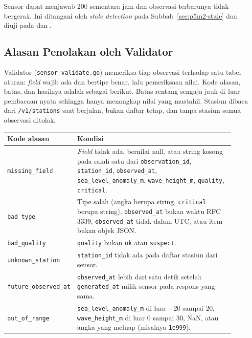 Sensor dapat menjawab 200 sementara jam dan observasi terbarunya tidak bergerak. Ini ditangani oleh \textit{stale detection} pada Subbab~\ref{sec:p5m2-stale} dan diuji pada  dan .

\subsection{Alasan Penolakan oleh Validator}

Validator (\texttt{sensor\_validate.go}) memeriksa tiap observasi terhadap satu tabel aturan: \textit{field} wajib ada dan bertipe benar, lalu pemeriksaan nilai. Kode alasan, batas, dan hasilnya adalah sebagai berikut. Batas rentang sengaja jauh di luar pembacaan nyata sehingga hanya menangkap nilai yang mustahil. Stasiun dibaca dari \texttt{/v1/stations} saat berjalan, bukan daftar tetap, dan tanpa stasiun semua observasi ditolak.

\begin{longtable}[]{|>{\raggedright\arraybackslash}p{0.22\linewidth}|>{\raggedright\arraybackslash}p{0.7\linewidth}|}
\hline
\textbf{Kode alasan} & \textbf{Kondisi} \\
\hline
\endfirsthead
\hline
\endhead
\texttt{missing\_field} & \textit{Field} tidak ada, bernilai null, atau string kosong pada salah satu dari \texttt{observation\_id}, \texttt{station\_id}, \texttt{observed\_at}, \texttt{sea\_level\_anomaly\_m}, \texttt{wave\_height\_m}, \texttt{quality}, \texttt{critical}. \\
\hline
\texttt{bad\_type} & Tipe salah (angka berupa string, \texttt{critical} berupa string), \texttt{observed\_at} bukan waktu RFC 3339, \texttt{observed\_at} tidak dalam UTC, atau item bukan objek JSON. \\
\hline
\texttt{bad\_quality} & \texttt{quality} bukan \texttt{ok} atau \texttt{suspect}. \\
\hline
\texttt{unknown\_station} & \texttt{station\_id} tidak ada pada daftar stasiun dari sensor. \\
\hline
\texttt{future\_observed\_at} & \texttt{observed\_at} lebih dari satu detik setelah \texttt{generated\_at} milik sensor pada respons yang sama. \\
\hline
\texttt{out\_of\_range} & \texttt{sea\_level\_anomaly\_m} di luar $-20$ sampai $20$, \texttt{wave\_height\_m} di luar $0$ sampai $30$, NaN, atau angka yang meluap (misalnya \texttt{1e999}). \\
\hline
\end{longtable}

